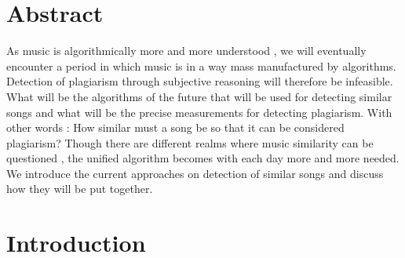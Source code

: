 \documentclass{article}
\begin{document}
	\section{Abstract}
		As music is algorithmically more and more understood , we will eventually encounter a period in which music is in a way mass manufactured by algorithms. Detection of plagiarism through subjective reasoning will therefore be infeasible. What will be the algorithms of the future that will be used for detecting similar songs and what will be the precise measurements for detecting plagiarism. With other words : How similar must a song be so that it can be considered plagiarism? Though there are different realms where music similarity can be questioned , the unified algorithm becomes with each day more and more needed. We introduce the current approaches on detection of similar songs and discuss how they will be put together.
	\section{Introduction}
	
		
\end{document}
